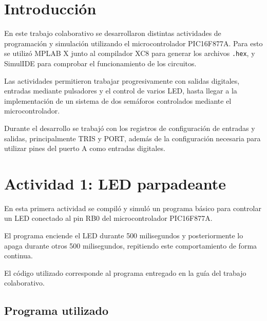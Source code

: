 \documentclass[12pt,a4paper]{article}
\begin{document}
\tableofcontents

\clearpage



\section{Introducción}

En este trabajo colaborativo se desarrollaron distintas actividades de programación y simulación utilizando el microcontrolador PIC16F877A. Para esto se utilizó MPLAB X junto al compilador XC8 para generar los archivos \texttt{.hex}, y SimulIDE para comprobar el funcionamiento de los circuitos.

Las actividades permitieron trabajar progresivamente con salidas digitales, entradas mediante pulsadores y el control de varios LED, hasta llegar a la implementación de un sistema de dos semáforos controlados mediante el microcontrolador.

Durante el desarrollo se trabajó con los registros de configuración de entradas y salidas, principalmente TRIS y PORT, además de la configuración necesaria para utilizar pines del puerto A como entradas digitales.


\section{Actividad 1: LED parpadeante}

En esta primera actividad se compiló y simuló un programa básico para controlar un LED conectado al pin RB0 del microcontrolador PIC16F877A.

El programa enciende el LED durante 500 milisegundos y posteriormente lo apaga durante otros 500 milisegundos, repitiendo este comportamiento de forma continua.

El código utilizado corresponde al programa entregado en la guía del trabajo colaborativo.

\subsection{Programa utilizado}
\end{document}
